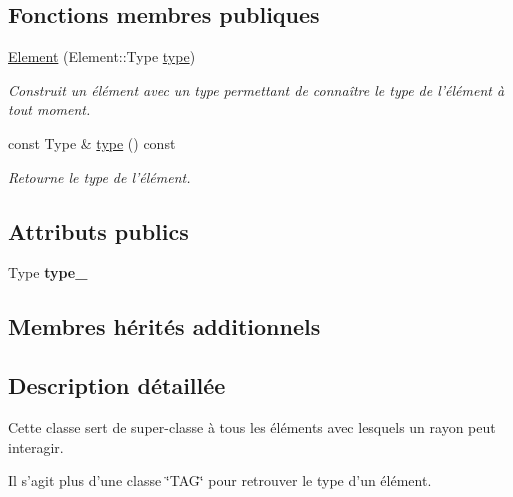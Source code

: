 \subsection*{Fonctions membres publiques}
\begin{DoxyCompactItemize}
\item 
\hypertarget{classElement_a0715913621e7695aba3b04d4d5fd140d}{\hyperlink{classElement_a0715913621e7695aba3b04d4d5fd140d}{Element} (Element\+::\+Type \hyperlink{classElement_a4c4d133a897618ffc6fe397b18593bc2}{type})}\label{classElement_a0715913621e7695aba3b04d4d5fd140d}

\begin{DoxyCompactList}\small\item\em Construit un élément avec un type permettant de connaître le type de l'élément à tout moment. \end{DoxyCompactList}\item 
const Type \& \hyperlink{classElement_a4c4d133a897618ffc6fe397b18593bc2}{type} () const 
\begin{DoxyCompactList}\small\item\em Retourne le type de l'élément. \end{DoxyCompactList}\end{DoxyCompactItemize}
\subsection*{Attributs publics}
\begin{DoxyCompactItemize}
\item 
\hypertarget{classElement_a3a623be6c6790403d4e585c587b813e2}{Type {\bfseries type\+\_\+}}\label{classElement_a3a623be6c6790403d4e585c587b813e2}

\end{DoxyCompactItemize}
\subsection*{Membres hérités additionnels}


\subsection{Description détaillée}
Cette classe sert de super-\/classe à tous les éléments avec lesquels un rayon peut interagir. 

Il s'agit plus d'une classe \char`\"{}\+T\+A\+G\char`\"{} pour retrouver le type d'un élément. 

